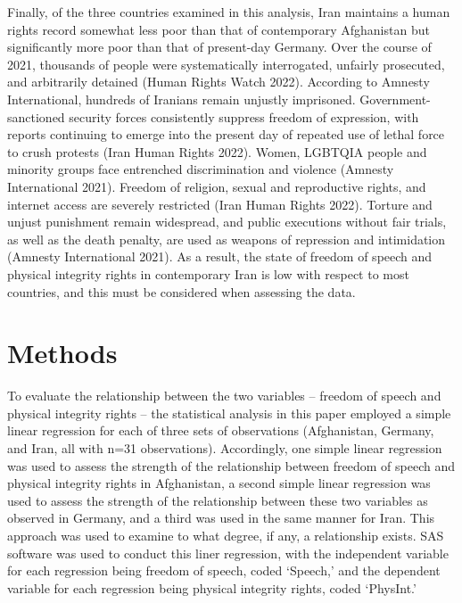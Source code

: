 \documentclass{article}
\begin{document}
Finally, of the three countries examined in this analysis, Iran maintains a human rights record somewhat less poor than that of contemporary Afghanistan but significantly more poor than that of present-day Germany. Over the course of 2021, thousands of people were systematically interrogated, unfairly prosecuted, and arbitrarily detained (Human Rights Watch 2022). According to Amnesty International, hundreds of Iranians remain unjustly imprisoned. Government-sanctioned security forces consistently suppress freedom of expression, with reports continuing to emerge into the present day of repeated use of lethal force to crush protests (Iran Human Rights 2022). Women, LGBTQIA people and minority groups face entrenched discrimination and violence (Amnesty International 2021). Freedom of religion, sexual and reproductive rights, and internet access are severely restricted (Iran Human Rights 2022). Torture and unjust punishment remain widespread, and public executions without fair trials, as well as the death penalty, are used as weapons of repression and intimidation (Amnesty International 2021). As a result, the state of freedom of speech and physical integrity rights in contemporary Iran is low with respect to most countries, and this must be considered when assessing the data.

\section{Methods}
To evaluate the relationship between the two variables – freedom of speech and physical integrity rights – the statistical analysis in this paper employed a simple linear regression for each of three sets of observations (Afghanistan, Germany, and Iran, all with n=31 observations). Accordingly, one simple linear regression was used to assess the strength of the relationship between freedom of speech and physical integrity rights in Afghanistan, a second simple linear regression was used to assess the strength of the relationship between these two variables as observed in Germany, and a third was used in the same manner for Iran. This approach was used to examine to what degree, if any, a relationship exists. SAS software was used to conduct this liner regression, with the independent variable for each regression being freedom of speech, coded ‘Speech,’ and the dependent variable for each regression being physical integrity rights, coded ‘PhysInt.’
\end{document}

